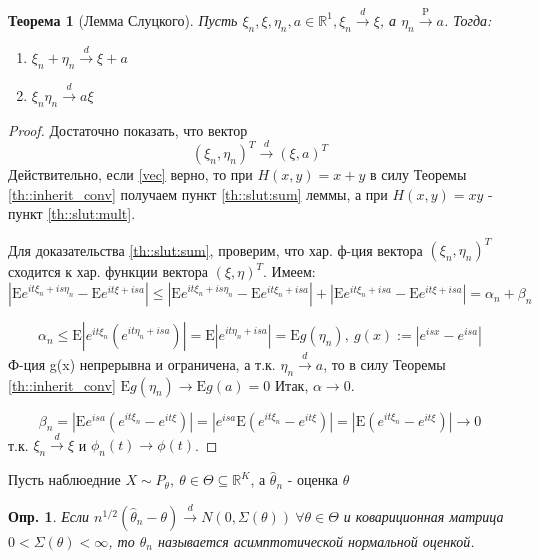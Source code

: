 \documentclass[12pt]{article}
\newtheorem{definition}{Опр.}
\theoremstyle{basic_theorem}
\theoremstyle{name_theorem}
\newtheorem*{named_theorem}{Теорема}
\def\R{
    \mathbb{R}
}
\def\E{
    \mathrm{E}
}
\def\P{
    \mathrm{P}
}
\begin{document}
\begin{named_theorem}[Лемма Слуцкого]
\label{th::slut}
    Пусть $\xi_n, \xi, \eta_n, a \in \R^1, \xi_n \xrightarrow{d} \xi$, а $\eta_n \xrightarrow{\P} a$.
    Тогда:
    \begin{enumerate}
        \item \label{th::slut:sum} $\xi_n + \eta_n \xrightarrow{d} \xi + a$
        \item \label{th::slut:mult} $\xi_n \eta_n \xrightarrow{d} a\xi$
    \end{enumerate}
\end{named_theorem}
\begin{proof}
    Достаточно показать, что вектор
    \begin{equation} \label{vec}
        (\xi_n, \eta_n)^T \xrightarrow{d} (\xi, a)^T 
    \end{equation}
    Действительно, если \ref{vec} верно, то при $H(x, y) = x + y$ в силу Теоремы \ref{th::inherit_conv} получаем пункт \ref{th::slut:sum} леммы,
    а при $H(x, y) = xy$ -  пункт \ref{th::slut:mult}.

    Для доказательства \ref{th::slut:sum}, проверим, что хар. ф-ция
    вектора $(\xi_n, \eta_n)^T$ сходится к хар. функции вектора $(\xi, \eta)^T$.
    Имеем: 
    $$|\E e^{it\xi_n + is\eta_n} - \E e^{it\xi + isa}| \leq | \E e^{it\xi_n + is\eta_n} - \E e^{it\xi_n + isa}| + | \E e^{it\xi_n + isa} - \E e^{it\xi + isa}| = \alpha_n + \beta_n$$

    $$\alpha_n \leq \E |e^{it\xi_n}(e^{it\eta_n + isa})| = \E |e^{it\eta_n + isa}| = \E g(\eta_n), \ g(x):= |e^{isx} - e^{isa}|$$
    Ф-ция g(x) непрерывна и ограничена, а т.к. $\eta_n \xrightarrow{d} a$,
    то в силу Теоремы \ref{th::inherit_conv} $\E g(\eta_n) \rightarrow \E g(a) = 0$
    Итак, $\alpha \rightarrow 0$.

    $$\beta_n = |\E e^{isa}(e^{it\xi_n} - e^{it\xi})| = |e^{isa} \E (e^{it\xi_n} - e^{it\xi})| = |\E (e^{it\xi_n} - e^{it\xi})| \rightarrow 0$$
    т.к. $\xi_n \xrightarrow{d} \xi$ и $\phi_n(t) \rightarrow \phi(t)$.
\end{proof}

Пусть наблюедние $X \sim  P_{\theta},\ \theta \in \Theta \subseteq \R^{K}$, а $\hat{\theta}_n$ - оценка $\theta$

\begin{definition}
    Если $n^{1/2}(\hat{\theta}_n - \theta) \xrightarrow{d} N(0, \Sigma(\theta)) \ \forall \theta \in \Theta$
    и ковариционная матрица $0 < \Sigma(\theta) < \infty$, то $\hat{\theta}_n$ называется асимптотической нормальной оценкой.
\end{definition}
\end{document}
